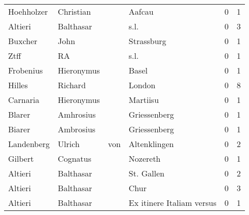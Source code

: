 \begin{center}
\begin{tiny}
\begin{longtabu}{llllrr}
               Hoehholzer &                          Christian &             &                                      Aafcau &          0 &         1 \\
                  Altieri &                          Balthasar &             &                                        s.l. &          0 &         3 \\
                  Buxcher &                               John &             &                                  Strassburg &          0 &         1 \\
                     Ztff &                                 RA &             &                                        s.l. &          0 &         1 \\
                Frobenius &                         Hieronymus &             &                                       Basel &          0 &         1 \\
                   Hilles &                            Richard &             &                                      London &          0 &         8 \\
                 Carnaria &                         Hieronymus &             &                                    Martiisu &          0 &         1 \\
                   Blarer &                          Amhrosius &             &                                Griessenberg &          0 &         1 \\
                   Biarer &                          Ambrosius &             &                                Griessenberg &          0 &         1 \\
               Landenberg &                             Ulrich &         von &                                Altenklingen &          0 &         2 \\
                  Gilbert &                           Cognatus &             &                                    Nozereth &          0 &         1 \\
                  Altieri &                          Balthasar &             &                                  St. Gallen &          0 &         2 \\
                  Altieri &                          Balthasar &             &                                        Chur &          0 &         3 \\
                  Altieri &                          Balthasar &             &                   Ex itinere Italiam versus &          0 &         1 \\

\end{longtabu}
\end{tiny}
\end{center}
